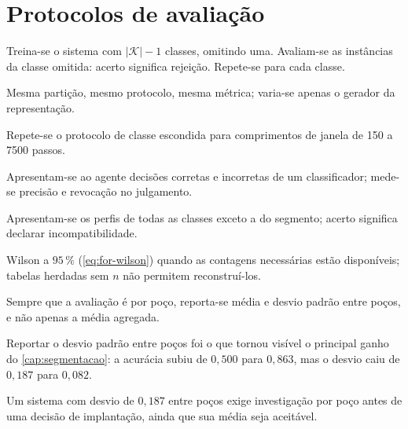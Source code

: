 \section{Protocolos de avaliação}

\begin{description}[leftmargin=0pt,style=nextline,itemsep=0.4em]

\item[Classe escondida (\cref{cap:closedworld}).] Treina-se o sistema com $|\mathcal{K}|
- 1$ classes, omitindo uma. Avaliam-se as instâncias da classe omitida: acerto significa
rejeição. Repete-se para cada classe.

\item[Comparação de arquiteturas (\cref{cap:mundoaberto}).] Mesma partição, mesmo
protocolo, mesma métrica; varia-se apenas o gerador da representação.

\item[Varredura de janela (\cref{cap:closedworld}).] Repete-se o protocolo de classe
escondida para comprimentos de janela de 150 a 7500 passos.

\item[Validação (\cref{cap:resultados-agente}).] Apresentam-se ao agente decisões
corretas e incorretas de um classificador; mede-se precisão e revocação no julgamento.

\item[Novidade com agente (\cref{cap:resultados-agente}).] Apresentam-se os perfis de
todas as classes exceto a do segmento; acerto significa declarar incompatibilidade.

\item[Intervalos de confiança.] Wilson a $95\,\%$ (\cref{eq:for-wilson}) quando as
contagens necessárias estão disponíveis; tabelas herdadas sem $n$ não permitem
reconstruí-los.

\item[Desvio entre poços.] Sempre que a avaliação é por poço, reporta-se média e desvio
padrão entre poços, e não apenas a média agregada.

\end{description}

\begin{destaque}
Reportar o desvio padrão entre poços foi o que tornou visível o principal ganho do
\cref{cap:segmentacao}: a acurácia subiu de $0{,}500$ para $0{,}863$, mas o desvio caiu
de $0{,}187$ para $0{,}082$.

Um sistema com desvio de $0{,}187$ entre poços exige investigação por poço antes de uma
decisão de implantação, ainda que sua média seja aceitável.
\end{destaque}

